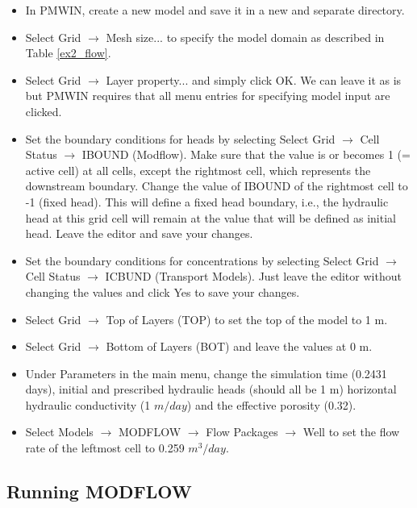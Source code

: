 \begin{itemize}

\item In PMWIN, create a new model and save it in a new and separate directory.

\item Select Grid $\rightarrow$ Mesh size... to specify the model domain as described in
Table \ref{ex2_flow}.

\item Select Grid $\rightarrow$ Layer property... and simply click OK. We can leave it as is but PMWIN requires that all menu entries for specifying model input are clicked.

\item Set the boundary conditions for heads by selecting Select Grid $\rightarrow$ Cell Status $\rightarrow$ IBOUND (Modflow). Make sure that the value is or becomes 1 (= active cell) at all cells, except the rightmost cell, which represents the downstream boundary. Change the value of IBOUND of the rightmost cell to -1 (fixed head). This will define a fixed head boundary, i.e., the hydraulic head
at this grid cell will remain at the value that will be defined as initial head. Leave the editor and save your changes.

\item Set the boundary conditions for concentrations by selecting Select Grid $\rightarrow$ Cell Status $\rightarrow$ ICBUND (Transport Models). Just leave the editor without changing the values and click Yes to save your changes.

\item Select Grid $\rightarrow$ Top of Layers (TOP) to set the top of the model to 1 m.

\item Select Grid $\rightarrow$ Bottom of Layers (BOT) and leave the values at 0 m.

\item Under Parameters in the main menu, change the simulation time (0.2431 days), initial and prescribed hydraulic heads (should all be 1 m) horizontal hydraulic conductivity (1 $m/day$) and the effective porosity (0.32).

\item Select Models $\rightarrow$ MODFLOW $\rightarrow$ Flow Packages $\rightarrow$ Well to set the flow rate of the leftmost cell to 0.259
$m^3/day$.

\end{itemize}

\subsection{Running MODFLOW}


